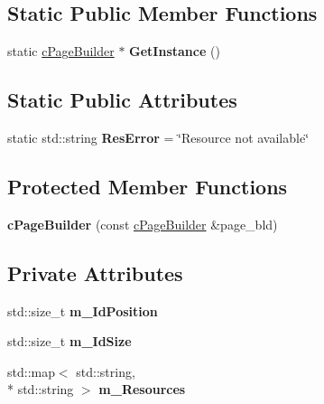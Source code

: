 \subsection*{Static Public Member Functions}
\begin{DoxyCompactItemize}
\item 
\hypertarget{classhttp__server_1_1cPageBuilder_acf7940105f1b4f5d77a0cecac9a69db6}{static \hyperlink{classhttp__server_1_1cPageBuilder}{c\-Page\-Builder} $\ast$ {\bfseries Get\-Instance} ()}\label{classhttp__server_1_1cPageBuilder_acf7940105f1b4f5d77a0cecac9a69db6}

\end{DoxyCompactItemize}
\subsection*{Static Public Attributes}
\begin{DoxyCompactItemize}
\item 
\hypertarget{classhttp__server_1_1cPageBuilder_ab72698e05f93aaa1c18f2f793b02df4d}{static std\-::string {\bfseries Res\-Error} = \char`\"{}Resource not available\char`\"{}}\label{classhttp__server_1_1cPageBuilder_ab72698e05f93aaa1c18f2f793b02df4d}

\end{DoxyCompactItemize}
\subsection*{Protected Member Functions}
\begin{DoxyCompactItemize}
\item 
\hypertarget{classhttp__server_1_1cPageBuilder_a3f3d04425b2f912c5616362b9be5d19e}{{\bfseries c\-Page\-Builder} (const \hyperlink{classhttp__server_1_1cPageBuilder}{c\-Page\-Builder} \&page\-\_\-bld)}\label{classhttp__server_1_1cPageBuilder_a3f3d04425b2f912c5616362b9be5d19e}

\end{DoxyCompactItemize}
\subsection*{Private Attributes}
\begin{DoxyCompactItemize}
\item 
\hypertarget{classhttp__server_1_1cPageBuilder_a98fc3701625a6e09deb368eca4aae6da}{std\-::size\-\_\-t {\bfseries m\-\_\-\-Id\-Position}}\label{classhttp__server_1_1cPageBuilder_a98fc3701625a6e09deb368eca4aae6da}

\item 
\hypertarget{classhttp__server_1_1cPageBuilder_a2a5da5d3ab0f9f61046e2111ea36b039}{std\-::size\-\_\-t {\bfseries m\-\_\-\-Id\-Size}}\label{classhttp__server_1_1cPageBuilder_a2a5da5d3ab0f9f61046e2111ea36b039}

\item 
\hypertarget{classhttp__server_1_1cPageBuilder_aab5bd8d3bf0b336cfe4f4334f3c78126}{std\-::map$<$ std\-::string, \\*
std\-::string $>$ {\bfseries m\-\_\-\-Resources}}\label{classhttp__server_1_1cPageBuilder_aab5bd8d3bf0b336cfe4f4334f3c78126}

\end{DoxyCompactItemize}
